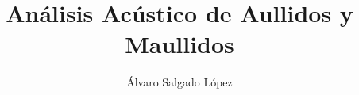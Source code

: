 \documentclass[journal]{IEEEtran}
\begin{document}
%
\title{Análisis Acústico de Aullidos y Maullidos}


\author{Álvaro Salgado López}

% 
%














\maketitle
\end{document}
